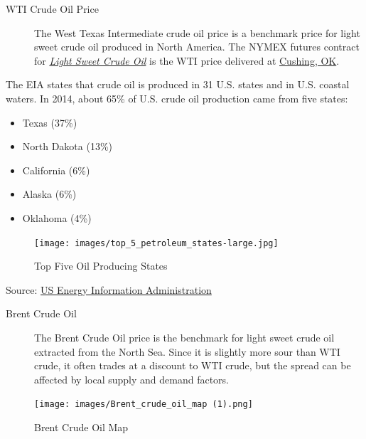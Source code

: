 \documentclass[
  letterpaper,
  DIV=11,
  numbers=noendperiod]{scrreprt}
\providecommand{\tightlist}{%
  \setlength{\itemsep}{0pt}\setlength{\parskip}{0pt}}\usepackage{longtable,booktabs,array}
\begin{document}
\begin{description}
\item[WTI Crude Oil Price]
The West Texas Intermediate crude oil price is a benchmark price for
light sweet crude oil produced in North America. The NYMEX futures
contract for
\href{http://www.cmegroup.com/trading/energy/crude-oil/light-sweet-crude.html}{\emph{Light
Sweet Crude Oil}} is the WTI price delivered at
\href{https://www.google.com/maps/place/Cushing,+OK+74023/@43.8498418,-87.2836175,5.17z/data=!4m2!3m1!1s0x87b169f80014c5c1:0xfe855f1914b195a}{Cushing,
OK}.
\end{description}

The EIA states that crude oil is produced in 31 U.S. states and in U.S.
coastal waters. In 2014, about 65\% of U.S. crude oil production came
from five states:

\begin{itemize}
\tightlist
\item
  Texas (37\%)
\item
  North Dakota (13\%)
\item
  California (6\%)
\item
  Alaska (6\%)
\item
  Oklahoma (4\%)
\end{itemize}

\begin{figure}

{\centering \texttt{[image: images/top\_5\_petroleum\_states-large.jpg]}

}

\caption{Top Five Oil Producing States}

\end{figure}

Source:
\href{http://www.eia.gov/Energyexplained/index.cfm?page=oil_home}{US
Energy Information Administration}

\begin{description}
\item[Brent Crude Oil]
The Brent Crude Oil price is the benchmark for light sweet crude oil
extracted from the North Sea. Since it is slightly more sour than WTI
crude, it often trades at a discount to WTI crude, but the spread can be
affected by local supply and demand factors.
\end{description}

\begin{figure}

{\centering \texttt{[image: images/Brent\_crude\_oil\_map (1).png]}

}

\caption{Brent Crude Oil Map}

\end{figure}
\end{document}

